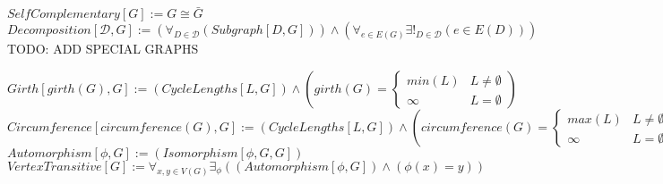 \documentclass{book}
\newcommand{\abr}{:=}
\newcommand{\st}{\mathbin{|}}
\newcommand{\utup}[1]{\{#1\}}
\begin{document}
$SelfComplementary[G] \abr G \cong \bar{G}$ \\
$Decomposition[\mathcal{D}, G] \abr (\forall_{D \in \mathcal{D}}(Subgraph[D, G])) \land (\forall_{e \in E(G)} \exists!_{D \in \mathcal{D}}(e \in E(D)))$ \\

TODO: ADD SPECIAL GRAPHS

$Girth[girth(G), G] \abr (CycleLengths[L, G]) \land \left(girth(G) =
\begin{cases}
  min(L) & L \neq \emptyset \\
  \infty & L = \emptyset
\end{cases}\right)$ \\
$Circumference[circumference(G), G] \abr (CycleLengths[L, G]) \land \left(circumference(G) =
\begin{cases}
  max(L) & L \neq \emptyset \\
  \infty & L = \emptyset
\end{cases}\right)$ \\

$Automorphism[\phi, G] \abr (Isomorphism[\phi, G, G])$ \\ %
$VertexTransitive[G] \abr \forall_{x, y \in V(G)} \exists_{\phi}((Automorphism[\phi, G]) \land (\phi(x) = y))$ \\
\end{document}
